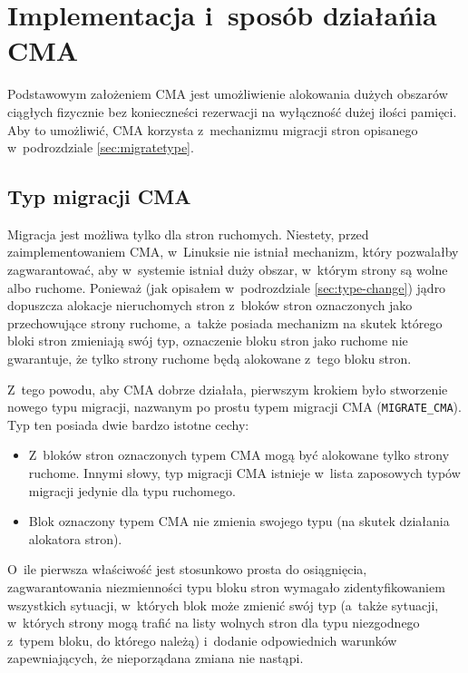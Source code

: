 \chapter{Implementacja i~sposób działańia CMA}

Podstawowym założeniem CMA jest umożliwienie alokowania dużych
obszarów ciągłych fizycznie bez konieczneści rezerwacji na wyłączność
dużej ilości pamięci.  Aby to umożliwić, CMA korzysta z~mechanizmu
migracji stron opisanego w~podrozdziale \ref{sec:migratetype}.

\section{Typ migracji CMA}\label{sec:migrate-cma}

Migracja jest możliwa tylko dla stron ruchomych.  Niestety, przed
zaimplementowaniem CMA, w~Linuksie nie istniał mechanizm, który
pozwalałby zagwarantować, aby w~systemie istniał duży obszar, w~którym
strony są wolne albo ruchome.  Ponieważ (jak opisałem w~podrozdziale
\ref{sec:type-change}) jądro dopuszcza alokacje nieruchomych stron
z~bloków stron oznaczonych jako przechowujące strony ruchome, a~także
posiada mechanizm na skutek którego bloki stron zmieniają swój typ,
oznaczenie bloku stron jako ruchome nie gwarantuje, że tylko strony
ruchome będą alokowane z~tego bloku stron.

Z~tego powodu, aby CMA dobrze działała, pierwszym krokiem było
stworzenie nowego typu migracji, nazwanym po prostu typem migracji CMA
(\lstinline|MIGRATE_CMA|).  Typ ten posiada dwie bardzo istotne cechy:

\begin{itemize}
\item Z~bloków stron oznaczonych typem CMA mogą być alokowane tylko
  strony ruchome.  Innymi słowy, typ migracji CMA istnieje w~lista
  zaposowych typów migracji jedynie dla typu ruchomego.
\item Blok oznaczony typem CMA nie zmienia swojego typu (na skutek
  działania alokatora stron).
\end{itemize}

O~ile pierwsza właściwość jest stosunkowo prosta do osiągnięcia,
zagwarantowania niezmienności typu bloku stron wymagało
zidentyfikowaniem wszystkich sytuacji, w~których blok może zmienić
swój typ (a~także sytuacji, w~których strony mogą trafić na listy
wolnych stron dla typu niezgodnego z~typem bloku, do którego należą)
i~dodanie odpowiednich warunków zapewniających, że nieporządana zmiana
nie nastąpi.

